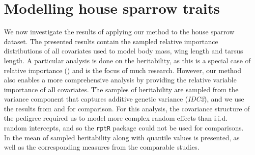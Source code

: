 \section{Modelling house sparrow traits}
\label{sec:heritability_results}
We now investigate the results of applying our method to the house sparrow dataset. The presented results contain the sampled relative importance distributions of all covariates used to model body mass, wing length and tarsus length. A particular analysis is done on the heritability, as this is a special case of relative importance () and is the focus of much research. However, our method also enables a more comprehensive analysis by providing the relative variable importance of all covariates. The samples of heritability are sampled from the variance component that captures additive genetic variance (\textit{IDC2}), and we use the results from \citet{Silva2017} and \citet{Muff2019Genetic} for comparison. For this analysis, the covariance structure of the pedigree required us to model more complex random effects than i.i.d. random intercepts, and so the \texttt{rptR} package could not be used for comparisons. In  the mean of sampled heritability along with quantile values is presented, as well as the corresponding measures from the comparable studies.
